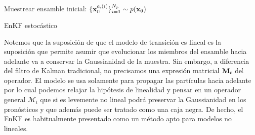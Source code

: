 \begin{algorithm}[H]\label{algo:enkf_pert_obs}
    Muestrear ensamble inicial: $\{\mathbf{x}_0^{a, (i)} \}_{i=1}^{N_p} \sim p(\mathbf{x}_0)$
    
\caption{EnKF estocástico}
\end{algorithm}

Notemos que la suposición de que el modelo de transición es lineal es la suposición que permite asumir que evolucionar los miembros del ensamble hacia adelante va a conservar la Gaussianidad de la muestra. Sin embargo, a diferencia del filtro de Kalman tradicional, no precisamos una expresión matricial $\mathbf{M}_t$ del operador. El modelo se usa solamente para propagar las partículas hacia adelante por lo cual podemos relajar la hipótesis de linealidad y pensar en un operador general $\mathcal{M}_t$ que si es levemente no lineal podrá preservar la Gaussianidad en los pronósticos y que además puede ser tratado como una caja negra. De hecho, el EnKF es habitualmente presentado como un método apto para modelos no lineales.

